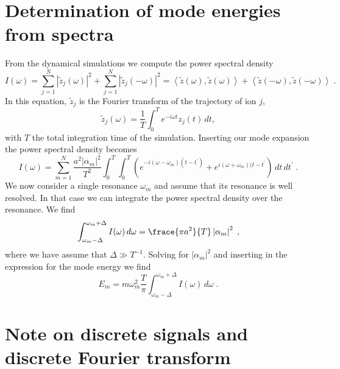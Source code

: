 \documentclass[aps, pra, preprint]{revtex4-1}
\begin{document}
\section{Determination of mode energies from spectra}

From the dynamical simulations we compute the power spectral
density
\begin{equation}
  I(\omega) =
    \sum_{j=1}^N\left| \tilde{z}_j(\omega) \right|^2 +
    \sum_{j=1}^N\left| \tilde{z}_j(-\omega) \right|^2 =
    \left\langle \tilde{z}(\omega), \tilde{z}(\omega)\right \rangle +
    \left\langle \tilde{z}(-\omega), \tilde{z}(-\omega)\right \rangle 
    \;.\label{eqn:psd}
\end{equation}
In this equation, $\tilde{z}_j$ is the Fourier transform of the
trajectory of ion $j$,
\begin{equation}
  \tilde{z}_j(\omega) = \frac{1}{T}\int_0^T e^{-i\omega t}z_j(t)\, dt,
\end{equation}
with $T$ the total integration time of the simulation. Inserting
our mode expansion the power spectral density becomes
\begin{equation}
  I(\omega) =
  \sum_{m=1}^N\frac{a^2 \left| \alpha_m \right|^2}{T^2}\int_0^T\int_0^T\left( e^{-i(\omega-\omega_m)(t-t^\prime)} + e^{i(\omega+\omega_m)(t-t^\prime} \right)\,dt\,dt^\prime\;.
\end{equation}
We now consider a single resonance $\omega_m$ and assume that
its resonance is well resolved. In that case we can integrate the
power spectral density over the resonance. We find
\begin{equation}
  \int_{\omega_m-\Delta}^{\omega_m+\Delta} I(\omega)\,d\omega =
  \frace{\pi a^2}{T}\left| \alpha_m \right|^2\;,
\end{equation}
where we have assume that $\Delta\gg T^{-1}$. Solving for
$|\alpha_m|^2$ and inserting in the expression for the mode
energy we find
\begin{equation}
  E_m=m\omega_m^2\frac{T}{\pi}\int_{\omega_m-\Delta}^{\omega_m+\Delta}I(\omega)\,d\omega\;.
\end{equation} 


\section{Note on discrete signals and discrete Fourier transform}
\end{document}
